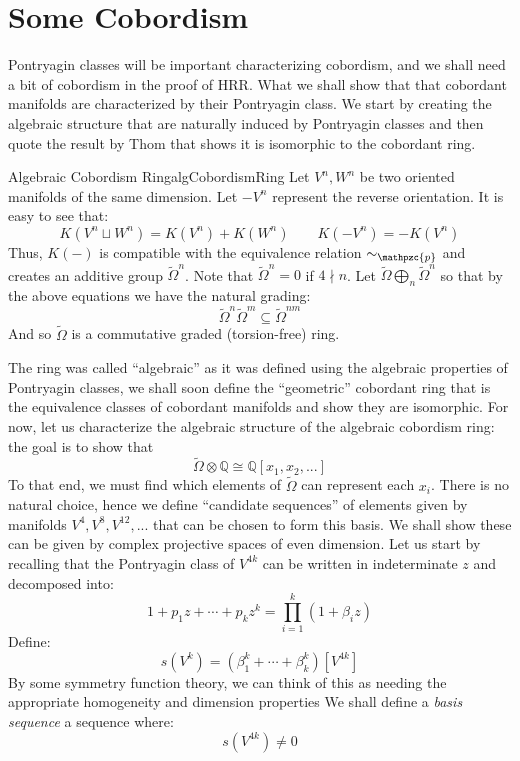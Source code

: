 \documentclass{book}
\newcommand{\Q}{{\mathbb{Q}}}
\newcommand{\cp}{{\mathpzc{p}}}
\newcommand{\sse}{\subseteq}
\newcommand{\dcup}{\sqcup}
\begin{document}
\section{Some Cobordism}\label{sec:cobordism}

Pontryagin classes will be important characterizing cobordism, and we shall need a bit of cobordism in the
proof of HRR. What we shall show that that cobordant manifolds are characterized by their Pontryagin class. We
start by creating the algebraic structure that are naturally induced by Pontryagin classes and then quote the
result by Thom that shows it is isomorphic to the cobordant ring.

\begin{defn}{Algebraic Cobordism Ring}{algCobordismRing}
  Let $V^n, W^n$ be two oriented manifolds of the same dimension. Let $-V^n$ represent the reverse orientation.
It is easy to see that:
\[
  K(V^n\dcup W^n) = K(V^n) + K(W^n) \qquad K(-V^n) = -K(V^n)
\]
Thus, $K(-)$ is compatible with the equivalence relation $\sim_\cp$ and creates an additive group
$\widetilde{\Omega}^n$. Note that $\widetilde{\Omega}^n = 0$ if $4\nmid n$. Let $\widetilde{\Omega}
\bigoplus_n \widetilde{\Omega}^n$ so that by the above equations we have the natural grading:
\[
  \widetilde{\Omega}^n \widetilde{\Omega}^m \sse \widetilde{\Omega}^{nm}
\]
And so $\widetilde{\Omega}$ is a commutative graded (torsion-free) ring.
\end{defn}

The ring was called ``algebraic'' as it was defined using the algebraic properties of Pontryagin classes, we
shall soon define the ``geometric'' cobordant ring that is the equivalence classes of cobordant manifolds and
show they are isomorphic. For now, let us characterize the algebraic structure of the algebraic cobordism
ring: the goal is to show that
\[
  \widetilde{\Omega}\otimes \Q \cong \Q[x_1, x_2, ...]
\]
To that end, we must find which elements of $\widetilde{\Omega}$ can represent each $x_i$. There is no natural
choice, hence we define ``candidate sequences'' of elements given by manifolds $V^4, V^8, V^{12}, ...$ that
can be chosen to form this basis. We shall show these can be given by complex projective spaces of even
dimension. Let us start by recalling that the Pontryagin class of $V^{4k}$ can be written in indeterminate $z$
and decomposed into:
\[
  1 + p_1z + \cdots + p_kz^k = \prod_{i=1}^k (1 + \beta_iz)
\]
Define:
\[
  s(V^k) = (\beta_1^k + \cdots + \beta_k^k)[V^{4k}]
\]
By some symmetry function theory, we can think of this as needing the appropriate homogeneity and dimension
properties We shall define a \emph{basis sequence} a sequence where:
\[
  s(V^{4k}) \ne 0
\]
\end{document}
